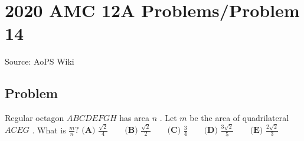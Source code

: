 \documentclass[12pt]{article}
\begin{document}
\section*{{2020 AMC 12A Problems/Problem 14}}
Source: AoPS Wiki

\subsection*{Problem}
Regular octagon $ABCDEFGH$ has area $n$ . Let $m$ be the area of quadrilateral $ACEG$ . What is $\tfrac{m}{n}?$ $\textbf{(A) } \frac{\sqrt{2}}{4} \qquad \textbf{(B) } \frac{\sqrt{2}}{2} \qquad \textbf{(C) } \frac{3}{4} \qquad \textbf{(D) } \frac{3\sqrt{2}}{5} \qquad \textbf{(E) } \frac{2\sqrt{2}}{3}$
\end{document}
